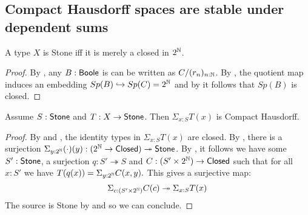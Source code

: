 \subsection{Compact Hausdorff spaces are stable under dependent sums}

\begin{lemma}\label{StoneAsClosedSubsetOfCantor}
A type $X$ is Stone iff it is merely a closed in $2^{\mathbb{N}}$.
\end{lemma}
\begin{proof}
  By , any $B:\mathsf{Boole}$ is can be written as $C/(r_n)_{n:\mathbb{N}}$.
  By , the quotient map induces an embedding $Sp(B)\hookrightarrow Sp(C)= 2^{\mathbb{N}}$
  and by  it follows that $Sp(B)$ is closed. 
\end{proof}

%
\begin{lemma}\label{SigmaStoneCompactHausdorff}
Assume $S:\mathsf{Stone}$ and $T:X\to \mathsf{Stone}$. Then $\Sigma_{x:S}T(x)$ is Compact Hausdorff.
\end{lemma}

\begin{proof}
  By  and , the identity types in $\Sigma_{x:S}T(x)$ are closed.
  By , there is a surjection 
  $\Sigma_{y:2^{\mathbb{N}}}(\cdot)(y):(2^{\mathbb{N}} \to \mathsf{Closed}) \twoheadrightarrow \mathsf{Stone}$. 
  By , it follows we have some $S':\mathsf{Stone}$, a surjection $q:S'\twoheadrightarrow S$ and 
%
$ C : (S'\times 2^{\mathbb{N}})\to\mathsf{Closed}$
such that for all $x:S'$ we have 
$T(q(x)) = \Sigma_{y:2^{\mathbb{N}}}C(x,y).$
This gives a surjective map:
$$ \Sigma_{c:(S'\times 2^{\mathbb{N}})}C(c)\twoheadrightarrow \Sigma_{x:S}T(x)$$
The source is Stone by  and  so we can conclude.
\end{proof}

